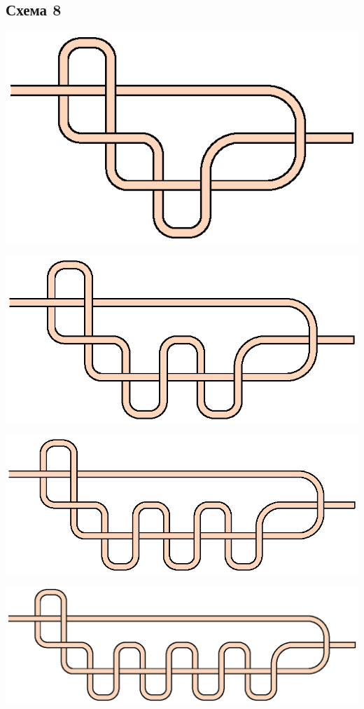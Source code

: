 \subsection{Схема 8}
\graphicspath{{\currentpath}}

\includegraphics{images/s-08-a1.eps}

\includegraphics{images/s-08-a2.eps}

\includegraphics{images/s-08-a3.eps}

\includegraphics{images/s-08-a4.eps}